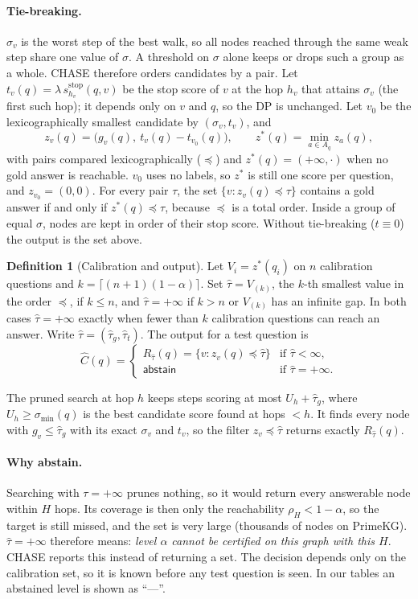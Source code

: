 \documentclass[11pt,a4paper]{article}
\theoremstyle{definition}
\newtheorem{definition}[theorem]{Definition}
\theoremstyle{remark}
\newcommand{\tauhat}{\hat{\tau}}
\newcommand{\method}{\textsc{CHASE}}
\begin{document}
\paragraph{Tie-breaking.}
$\sigma_v$ is the worst step of the best walk, so all nodes reached through the same weak step share one value of $\sigma$. A threshold on $\sigma$ alone keeps or drops such a group as a whole. \method{} therefore orders candidates by a pair. Let $t_v(q)=\lambda\,s^{\text{stop}}_{h_v}(q,v)$ be the stop score of $v$ at the hop $h_v$ that attains $\sigma_v$ (the first such hop); it depends only on $v$ and $q$, so the DP is unchanged. Let $v_0$ be the lexicographically smallest candidate by $(\sigma_v,t_v)$, and
\[
z_v(q)=\big(g_v(q),\ t_v(q)-t_{v_0}(q)\big),\qquad z^*(q)=\min_{a\in A_q} z_a(q),
\]
with pairs compared lexicographically ($\preceq$) and $z^*(q)=(+\infty,\cdot)$ when no gold answer is reachable. $v_0$ uses no labels, so $z^*$ is still one score per question, and $z_{v_0}=(0,0)$. For every pair $\tau$, the set $\{v:z_v(q)\preceq\tau\}$ contains a gold answer if and only if $z^*(q)\preceq\tau$, because $\preceq$ is a total order. Inside a group of equal $\sigma$, nodes are kept in order of their stop score. Without tie-breaking ($t\equiv0$) the output is the set above.

\begin{definition}[Calibration and output]\label{def:out}
Let $V_i=z^*(q_i)$ on $n$ calibration questions and $k=\lceil(n+1)(1-\alpha)\rceil$. Set $\tauhat=V_{(k)}$, the $k$-th smallest value in the order $\preceq$, if $k\le n$, and $\tauhat=+\infty$ if $k>n$ or $V_{(k)}$ has an infinite gap. In both cases $\tauhat=+\infty$ exactly when fewer than $k$ calibration questions can reach an answer. Write $\tauhat=(\tauhat_g,\tauhat_t)$. The output for a test question is
\[
\hat C(q)=\begin{cases}R_{\tauhat}(q)=\{v:z_v(q)\preceq\tauhat\} & \text{if }\tauhat<\infty,\\[2pt]
\textsf{abstain} & \text{if }\tauhat=+\infty.\end{cases}
\]
\end{definition}

The pruned search at hop $h$ keeps steps scoring at most $U_h+\tauhat_g$, where $U_h\ge\sigma_{\min}(q)$ is the best candidate score found at hops $<h$. It finds every node with $g_v\le\tauhat_g$ with its exact $\sigma_v$ and $t_v$, so the filter $z_v\preceq\tauhat$ returns exactly $R_{\tauhat}(q)$.

\paragraph{Why abstain.}
Searching with $\tau=+\infty$ prunes nothing, so it would return every answerable node within $H$ hops. Its coverage is then only the reachability $\rho_H<1-\alpha$, so the target is still missed, and the set is very large (thousands of nodes on PrimeKG). $\tauhat=+\infty$ therefore means: \emph{level $\alpha$ cannot be certified on this graph with this $H$}. \method{} reports this instead of returning a set. The decision depends only on the calibration set, so it is known before any test question is seen. In our tables an abstained level is shown as ``---''.
\end{document}
